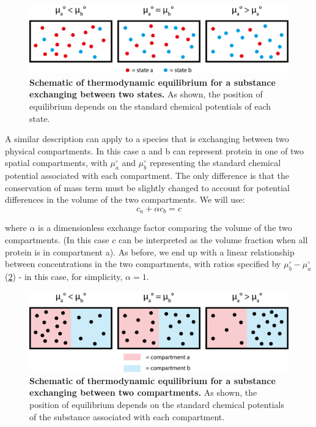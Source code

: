 \documentclass[12pt]{"report"}
\newcommand{\mycaption}[2]{\caption[#1]{\textbf{#1.} #2}}
\begin{document}
\begin{figure}
\includegraphics[scale=0.9]{thermodynamic_simple_example2}
\centering
\mycaption{Schematic of thermodynamic equilibrium for a substance exchanging between two states}{
As shown, the position of equilibrium depends on the standard chemical potentials of each state.}
\label{fig:thermodynamic_simple_example2}
\end{figure}

A similar description can apply to a species that is exchanging between two physical compartments. In this case a and b can represent protein in one of two spatial compartments, with $\mu_a^{\circ}$ and $\mu_b^{\circ}$ representing the standard chemical potential associated with each compartment. The only difference is that the conservation of mass term must be slightly changed to account for potential differences in the volume of the two compartments. We will use:
\begin{equation}
c_a + \alpha c_b = c
\end{equation}

where $\alpha$ is a dimensionless exchange factor comparing the volume of the two compartments. (In this case $c$ can be interpreted as the volume fraction when all protein is in compartment a). As before, we end up with a linear relationship between concentrations in the two compartments, with ratios specified by $\mu_b^{\circ} - \mu_a^{\circ}$ (\cref{fig:thermodynamic_simple_example}) - in this case, for simplicity, $\alpha = 1$.\\

\begin{figure}
\includegraphics[scale=0.9]{thermodynamic_simple_example}
\centering
\mycaption{Schematic of thermodynamic equilibrium for a substance exchanging between two compartments}{
As shown, the position of equilibrium depends on the standard chemical potentials of the substance associated with each compartment.}
\label{fig:thermodynamic_simple_example}
\end{figure}
\end{document}
